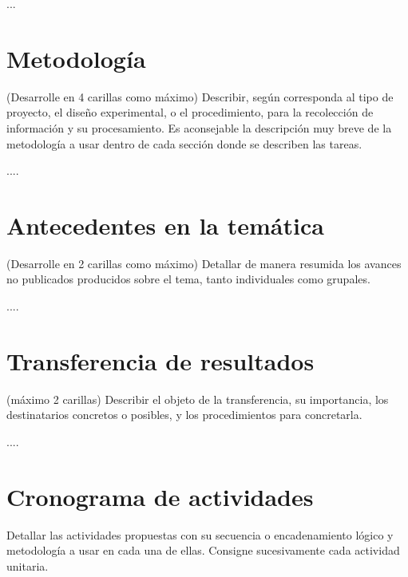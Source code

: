 \documentclass[11pt,a4paper]{article}
\begin{document}
...

\section*{Metodología} {(Desarrolle en 4 carillas como máximo) Describir, según corresponda al tipo de proyecto, el diseño experimental, o el procedimiento, para la recolección de información y su procesamiento. Es aconsejable la descripción muy breve de la metodología a usar dentro de cada sección donde se describen las tareas.\\}

....

\section*{Antecedentes en la temática} {\small (Desarrolle en 2 carillas como máximo) Detallar de manera resumida los avances no publicados producidos sobre el tema, tanto individuales como grupales.\\}

....

\section*{Transferencia de resultados} {\small (máximo 2 carillas) Describir el objeto de la transferencia, su importancia, los destinatarios concretos o posibles, y los procedimientos para concretarla.\\}

....


\section*{Cronograma de actividades} {\small Detallar las actividades propuestas con su secuencia o encadenamiento lógico y metodología a usar en cada una de ellas. Consigne sucesivamente cada actividad unitaria.}
\end{document}
